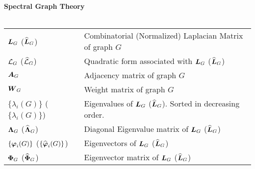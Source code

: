 \noindent \textbf{Spectral Graph Theory}\\ 
\vspace{\headingsep} \\
\begin{tabular}{p{\colwidth}l}
	{$\vb*{L}_G$ ($\widehat{\vb*{L}}_G$)} & {Combinatorial (Normalized) Laplacian Matrix of graph $G$} \\
	{$\mathcal{L}_G$ ($\widehat{\mathcal{L}}_G$)} & Quadratic form associated with $\vb*{L}_G$ ($\widehat{\vb*{L}}_G$)\\
	{$\vb*{A}_G$} & {Adjacency matrix of graph $G$}\\
	{$\vb*{W}_G$} & {Weight matrix of graph $G$}\\
	$\{\lambda_i(G)\}$ ($\{\lambda_i(G)\}$) & Eigenvalues of $\vb*{L}_G$ ($\widehat{\vb*{L}}_G$). Sorted in decreasing order. \\
	$\vb{\Lambda}_G$ ($\widehat{\vb{\Lambda}}_G$) & Diagonal Eigenvalue matrix of $\vb*{L}_G$ ($\widehat{\vb*{L}}_G$) \\
	$\{\vb*{\varphi}_i(G)\}$ ($\{\widehat{\vb*{\varphi}}_i(G)\}$) & Eigenvectors of $\vb*{L}_G$ ($\widehat{\vb*{L}}_G$)\\
	{$\boldsymbol{\Phi}_G$ ($\widehat{\boldsymbol{\Phi}}_G$)} & Eigenvector matrix of $\vb*{L}_G$ ($\widehat{\vb*{L}}_G$)
\end{tabular}
